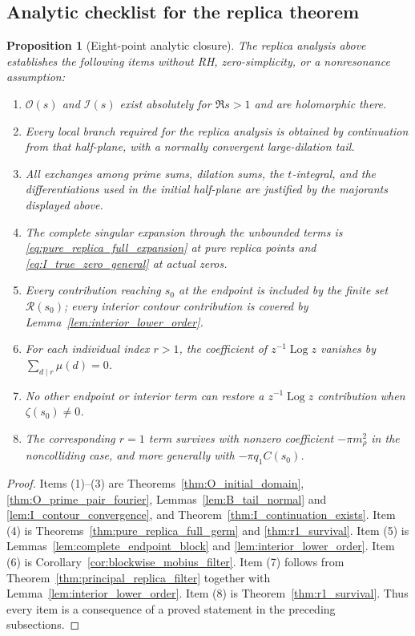 \documentclass[11pt]{amsart}
\numberwithin{equation}{section}
\theoremstyle{plain}
\newtheorem{proposition}[theorem]{Proposition}
\theoremstyle{definition}
\theoremstyle{remark}
\newcommand{\Log}{\operatorname{Log}}
\begin{document}
\subsection{Analytic checklist for the replica theorem}
\label{subsec:replica_checklist}

\begin{proposition}[Eight-point analytic closure]
\label{prop:eight_point_closure}
The replica analysis above establishes the following items without RH,
zero-simplicity, or a nonresonance assumption:
\begin{enumerate}[label=(\arabic*)]
\item \(\mathcal O(s)\) and \(\mathcal I(s)\) exist absolutely for
\(\Re s>1\) and are holomorphic there.
\item Every local branch required for the replica analysis is obtained by
continuation from that half-plane, with a normally convergent large-dilation
tail.
\item All exchanges among prime sums, dilation sums, the \(t\)-integral, and
the differentiations used in the initial half-plane are justified by the
majorants displayed above.
\item The complete singular expansion through the unbounded terms is
\eqref{eq:pure_replica_full_expansion} at pure replica points and
\eqref{eq:I_true_zero_general} at actual zeros.
\item Every contribution reaching \(s_0\) at the endpoint is included by the
finite set \(\mathcal R(s_0)\); every interior contour contribution is covered
by Lemma~\ref{lem:interior_lower_order}.
\item For each individual index \(r>1\), the coefficient of
\(z^{-1}\Log z\) vanishes by
\(\sum_{d\mid r}\mu(d)=0\).
\item No other endpoint or interior term can restore a
\(z^{-1}\Log z\) contribution when \(\zeta(s_0)\ne0\).
\item The corresponding \(r=1\) term survives with nonzero coefficient
\(-\pi m_\rho^2\) in the noncolliding case, and more generally with
\(-\pi q_1C(s_0)\).
\end{enumerate}
\end{proposition}

\begin{proof}
Items (1)--(3) are Theorems~\ref{thm:O_initial_domain},
\ref{thm:O_prime_pair_fourier}, Lemmas~\ref{lem:B_tail_normal} and
\ref{lem:I_contour_convergence}, and Theorem~\ref{thm:I_continuation_exists}.
Item (4) is Theorems~\ref{thm:pure_replica_full_germ} and
\ref{thm:r1_survival}.  Item (5) is Lemmas~\ref{lem:complete_endpoint_block}
and \ref{lem:interior_lower_order}.  Item (6) is
Corollary~\ref{cor:blockwise_mobius_filter}.  Item (7) follows from
Theorem~\ref{thm:principal_replica_filter} together with
Lemma~\ref{lem:interior_lower_order}.  Item (8) is
Theorem~\ref{thm:r1_survival}.  Thus every item is a consequence of a proved
statement in the preceding subsections.
\end{proof}
\end{document}
